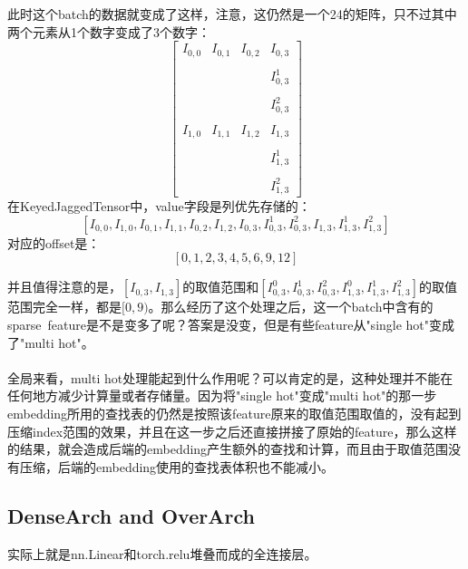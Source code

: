 \documentclass{article}
\begin{document}
此时这个batch的数据就变成了这样，注意，这仍然是一个2\times4的矩阵，只不过其中两个元素从1个数字变成了3个数字：
$$
\begin{bmatrix}
    I_{0,0} & I_{0,1} & I_{0,2} & I_{0,3} \\\\
    \       & \       & \       & I_{0,3}^1 \\\\
    \       & \       & \       & I_{0,3}^2 \\\\
    I_{1,0} & I_{1,1} & I_{1,2} & I_{1,3} \\\\
    \       & \       & \       & I_{1,3}^1 \\\\
    \       & \       & \       & I_{1,3}^2
\end{bmatrix}
$$
在KeyedJaggedTensor中，value字段是列优先存储的：
$$
[I_{0,0}, I_{1,0}, I_{0,1}, I_{1,1}, I_{0,2}, I_{1,2}, I_{0,3}, I_{0,3}^1, I_{0,3}^2, I_{1,3}, I_{1,3}^1, I_{1,3}^2]
$$
对应的offset是：
$$
[0, 1, 2, 3, 4, 5 ,6, 9, 12]
$$

并且值得注意的是，$[I_{0,3}, I_{1,3}]$的取值范围和$[I_{0,3}^0, I_{0,3}^1, I_{0,3}^2, I_{1,3}^0, I_{1,3}^1, I_{1,3}^2]$的取值范围完全一样，都是$[0, 9)$。那么经历了这个处理之后，这一个batch中含有的sparse\ feature是不是变多了呢？答案是没变，但是有些feature从"single hot"变成了"multi hot"。
\paragraph*{}全局来看，multi hot处理能起到什么作用呢？可以肯定的是，这种处理并不能在任何地方减少计算量或者存储量。因为将"single hot"变成"multi hot"的那一步embedding所用的查找表的仍然是按照该feature原来的取值范围取值的，没有起到压缩index范围的效果，并且在这一步之后还直接拼接了原始的feature，那么这样的结果，就会造成后端的embedding产生额外的查找和计算，而且由于取值范围没有压缩，后端的embedding使用的查找表体积也不能减小。

\subsection{DenseArch and OverArch}
实际上就是nn.Linear和torch.relu堆叠而成的全连接层。
\end{document}
